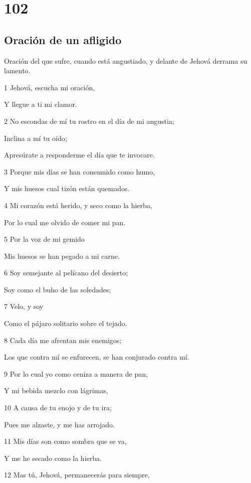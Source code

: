 \chapter{102}

\section*{Oración de un afligido}

\par Oración del que sufre, cuando está angustiado, y delante de Jehová derrama su lamento.

\par 1 Jehová, escucha mi oración,
\par Y llegue a ti mi clamor.
\par 2 No escondas de mí tu rostro en el día de mi angustia;
\par Inclina a mí tu oído;
\par Apresúrate a responderme el día que te invocare.
\par 3 Porque mis días se han consumido como humo,
\par Y mis huesos cual tizón están quemados.
\par 4 Mi corazón está herido, y seco como la hierba,
\par Por lo cual me olvido de comer mi pan.
\par 5 Por la voz de mi gemido
\par Mis huesos se han pegado a mi carne.
\par 6 Soy semejante al pelícano del desierto;
\par Soy como el buho de las soledades;
\par 7 Velo, y soy
\par Como el pájaro solitario sobre el tejado.
\par 8 Cada día me afrentan mis enemigos;
\par Los que contra mí se enfurecen, se han conjurado contra mí.
\par 9 Por lo cual yo como ceniza a manera de pan,
\par Y mi bebida mezclo con lágrimas,
\par 10 A causa de tu enojo y de tu ira;
\par Pues me alzaste, y me has arrojado.
\par 11 Mis días son como sombra que se va,
\par Y me he secado como la hierba.
\par 12 Mas tú, Jehová, permanecerás para siempre,

